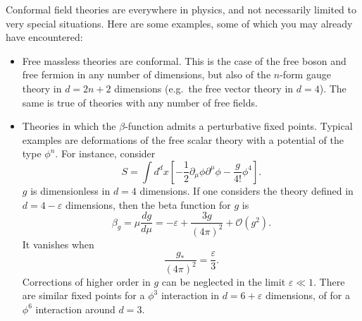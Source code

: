 \documentclass[a4paper,12pt]{article}
\renewcommand{\O}{\mathcal{O}}
\numberwithin{equation}{section}
\begin{document}
Conformal field theories are everywhere in physics, and not necessarily limited to very special situations. Here are some examples, some of which you may already have encountered:%
%
\begin{itemize}

\item
Free massless theories are conformal. This is the case of the free boson and free fermion in any number of dimensions, but also of the $n$-form gauge theory in $d = 2n + 2$ dimensions (e.g.~the free vector theory in $d = 4$). The same is true of theories with any number of free fields.

\item
Theories in which the $\beta$-function admits a perturbative fixed points. Typical examples are deformations of the free scalar theory with a potential of the type $\phi^n$. For instance, consider
\begin{equation}
	S = \int d^dx \left[
	- \frac{1}{2} \partial_\mu \phi \partial^\mu \phi
	- \frac{g}{4!} \phi^4 \right].
\end{equation}
$g$ is dimensionless in $d = 4$ dimensions. If one considers the theory defined in $d = 4 - \varepsilon$ dimensions, then the beta function for $g$ is
\begin{equation}
	\beta_g = \mu \frac{dg}{d\mu}
	= - \varepsilon + \frac{3g}{(4\pi)^2}
	+ \O(g^2).
\end{equation}
It vanishes when
\begin{equation}
	\frac{g_*}{(4\pi)^2} = \frac{\varepsilon}{3}.
\end{equation}
Corrections of higher order in $g$ can be neglected in the limit $\varepsilon \ll 1$.
There are similar fixed points for a $\phi^3$ interaction in $d = 6 + \varepsilon$ dimensions, of for a $\phi^6$ interaction around $d = 3$.



\end{itemize}
\end{document}
